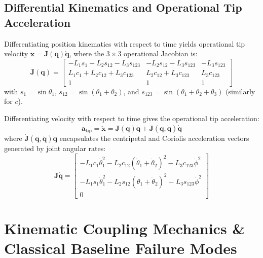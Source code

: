 \documentclass{article}
\begin{document}
\subsection{Differential Kinematics and Operational Tip Acceleration}
Differentiating position kinematics with respect to time yields operational tip velocity $\dot{\mathbf{x}} = \mathbf{J}(\mathbf{q})\dot{\mathbf{q}}$, where the $3 \times 3$ operational Jacobian is:
\begin{equation}
\mathbf{J}(\mathbf{q}) = \begin{bmatrix}
-L_1 s_1 - L_2 s_{12} - L_3 s_{123} & -L_2 s_{12} - L_3 s_{123} & -L_3 s_{123} \\
 L_1 c_1 + L_2 c_{12} + L_3 c_{123} &  L_2 c_{12} + L_3 c_{123} &  L_3 c_{123} \\
 1 & 1 & 1
\end{bmatrix}
\label{eq:jacobian}
\end{equation}
with $s_1 = \sin\theta_1$, $s_{12} = \sin(\theta_1+\theta_2)$, and $s_{123} = \sin(\theta_1+\theta_2+\theta_3)$ (similarly for $c$).

Differentiating velocity with respect to time gives the operational tip acceleration:
\begin{equation}
\mathbf{a}_{\text{tip}} = \ddot{\mathbf{x}} = \mathbf{J}(\mathbf{q})\ddot{\mathbf{q}} + \dot{\mathbf{J}}(\mathbf{q}, \dot{\mathbf{q}})\dot{\mathbf{q}}
\label{eq:a_tip}
\end{equation}
where $\dot{\mathbf{J}}(\mathbf{q}, \dot{\mathbf{q}})\dot{\mathbf{q}}$ encapsulates the centripetal and Coriolis acceleration vectors generated by joint angular rates:
\begin{equation}
\dot{\mathbf{J}}\dot{\mathbf{q}} = \begin{bmatrix}
-L_1 c_1 \dot{\theta}_1^2 - L_2 c_{12} (\dot{\theta}_1+\dot{\theta}_2)^2 - L_3 c_{123} \dot{\phi}^2 \\
-L_1 s_1 \dot{\theta}_1^2 - L_2 s_{12} (\dot{\theta}_1+\dot{\theta}_2)^2 - L_3 s_{123} \dot{\phi}^2 \\
0
\end{bmatrix}
\label{eq:jdot_qdot}
\end{equation}

\section{Kinematic Coupling Mechanics \& Classical Baseline Failure Modes}
\end{document}
